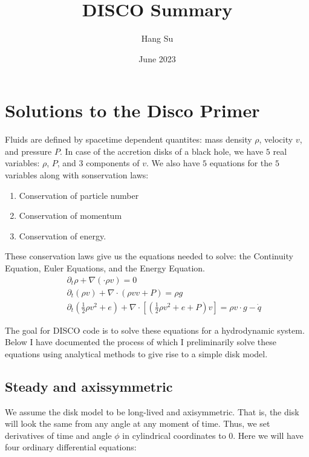 \documentclass{article}
\title{DISCO Summary}
\author{Hang Su}
\date{June 2023}
\begin{document}
\maketitle

\section{Solutions to the Disco Primer}
Fluids are defined by spacetime dependent quantites: mass density $\rho$, velocity $v$, and pressure $P$.
In case of the accretion disks of a black hole, we have $5$ real variables: $\rho$, $P$, and $3$
components of $v$. We also have $5$ equations for the $5$ variables along with sonservation laws: 
\begin{enumerate}
    \item Conservation of particle number
    \item Conservation of momentum
    \item Conservation of energy.
\end{enumerate}

These conservation laws give us the equations needed to solve: the Continuity Equation, Euler Equations,
and the Energy Equation.
\begin{eqnarray}
    && \partial_t \rho + \nabla (\cdot \rho v) = 0 \nonumber \\
    && \partial_t (\rho v) + \nabla \cdot (\rho vv + P) =  \rho g \nonumber \\
    && \partial _t (\frac{1}{2} \rho v^2 + e) + \nabla \cdot \left[\left(\frac{1}{2
    } \rho v^2 + e + P \right) v \right] = \rho v \cdot g - \dot q
\end{eqnarray}

The goal for DISCO code is to solve these equations for a hydrodynamic system. Below I have documented
the process of which I preliminarily solve these equations using analytical methods to give rise to 
a simple disk model. 

\subsection{Steady and axissymmetric}

We assume the disk model to be long-lived and axisymmetric. That is, the disk will look the same
from any angle at any moment of time. Thus, we set derivatives of time and angle $\phi$ in cylindrical coordinates
to $0$. Here we will have four ordinary differential equations:
\end{document}
